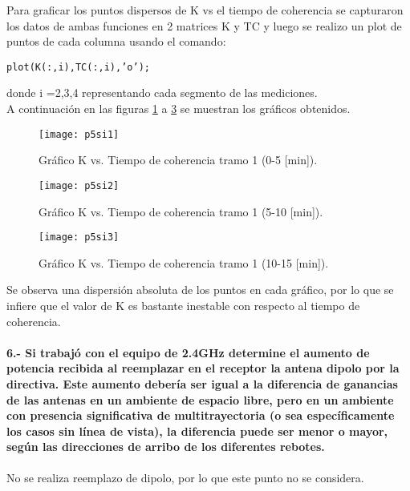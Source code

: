 \documentclass[12pt]{article}
\begin{document}
Para graficar los puntos dispersos de K vs el tiempo de coherencia se capturaron los datos 
de ambas funciones en 2 matrices K y TC y luego se realizo un plot de puntos de cada 
columna usando el comando:
\begin{verbatim}
plot(K(:,i),TC(:,i),’o’);
\end{verbatim}

donde i =2,3,4 representando cada segmento de las mediciones.\\

A continuación en las figuras \ref{fig:p5si1} a \ref{fig:p5si3} se muestran los gráficos 
obtenidos.\\

\begin{figure}[H]
  \centering
        \texttt{[image: p5si1]}
		\caption{\footnotesize
		Gráfico K vs. Tiempo de coherencia tramo 1 (0-5 [min]).}
\label{fig:p5si1}
\end{figure}

\begin{figure}[H]
  \centering
        \texttt{[image: p5si2]}
		\caption{\footnotesize
		Gráfico K vs. Tiempo de coherencia tramo 1 (5-10 [min]).}
\label{fig:p5si2}
\end{figure}

\begin{figure}[H]
  \centering
        \texttt{[image: p5si3]}
		\caption{\footnotesize
		Gráfico K vs. Tiempo de coherencia tramo 1 (10-15 [min]).}
\label{fig:p5si3}
\end{figure}

Se observa una dispersión absoluta de los puntos en cada gráfico, por lo que se infiere 
que el valor de K es bastante inestable con respecto al tiempo de coherencia.\\


\paragraph{6.- Si trabajó con el equipo de 2.4GHz determine el aumento de potencia recibida al 
reemplazar en el receptor la antena dipolo por la directiva. Este aumento debería ser igual a 
la diferencia de ganancias de las antenas en un ambiente de espacio libre, pero en un ambiente 
con presencia significativa de multitrayectoria (o sea específicamente los casos sin línea de 
vista), la diferencia puede ser menor o mayor, según las direcciones de arribo de los diferentes 
rebotes.\\}
No se realiza reemplazo de dipolo, por lo que este punto no se considera.
\end{document}
